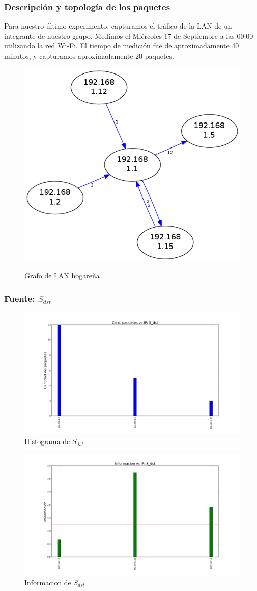 \subsubsection{Descripción y topología de los paquetes}

Para nuestro último experimento, capturamos el tráfico de la LAN de un integrante de nuestro grupo. Medimos el Miércoles 17 de Septiembre a las 00:00 utilizando la red Wi-Fi. El tiempo de medición fue de aproximadamente 40 minutos, y capturamos aproximadamente 20 paquetes.

\begin{figure}[H]
  \begin{center}
    \includegraphics[width=0.3\linewidth]{../imgs/red-hogarena_red.png}
    \label{fig:FedeGrafo}
    \caption{Grafo de LAN hogareña}
  \end{center}
\end{figure}

\subsubsection{Fuente: $S_{dst}$}

\begin{figure}[H]\centering
    \includegraphics[width=0.8\linewidth]{../imgs/red-hogarena_S_dst_hist.png}
    \caption{Histograma de $S_{dst}$}\label{fig:Fede-dst-hist}
\end{figure}

\begin{figure}[H]\centering
    \includegraphics[width=0.8\linewidth]{../imgs/red-hogarena_S_dst_info.png}
    \caption{Informacion de $S_{dst}$}\label{fig:Fede-dst-info}
\end{figure}

